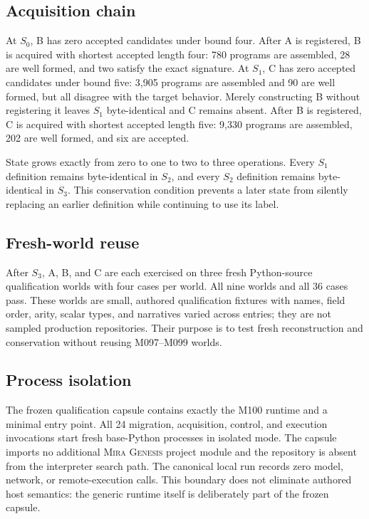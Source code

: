 \documentclass[10pt]{article}
\newcommand{\genesis}{\textsc{Mira Genesis}\xspace}
\begin{document}
\subsection{Acquisition chain}
At $S_0$, B has zero accepted candidates under bound four. After A is registered, B is acquired with shortest accepted length four: 780 programs are assembled, 28 are well formed, and two satisfy the exact signature. At $S_1$, C has zero accepted candidates under bound five: 3,905 programs are assembled and 90 are well formed, but all disagree with the target behavior. Merely constructing B without registering it leaves $S_1$ byte-identical and C remains absent. After B is registered, C is acquired with shortest accepted length five: 9,330 programs are assembled, 202 are well formed, and six are accepted.

State grows exactly from zero to one to two to three operations. Every $S_1$ definition remains byte-identical in $S_2$, and every $S_2$ definition remains byte-identical in $S_3$. This conservation condition prevents a later state from silently replacing an earlier definition while continuing to use its label.

\subsection{Fresh-world reuse}
After $S_3$, A, B, and C are each exercised on three fresh Python-source qualification worlds with four cases per world. All nine worlds and all 36 cases pass. These worlds are small, authored qualification fixtures with names, field order, arity, scalar types, and narratives varied across entries; they are not sampled production repositories. Their purpose is to test fresh reconstruction and conservation without reusing M097--M099 worlds.

\subsection{Process isolation}
The frozen qualification capsule contains exactly the M100 runtime and a minimal entry point. All 24 migration, acquisition, control, and execution invocations start fresh base-Python processes in isolated mode. The capsule imports no additional \genesis project module and the repository is absent from the interpreter search path. The canonical local run records zero model, network, or remote-execution calls. This boundary does not eliminate authored host semantics: the generic runtime itself is deliberately part of the frozen capsule.
\end{document}
